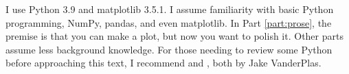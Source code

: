 I use Python 3.9 and matplotlib 3.5.1. I assume familiarity with basic Python programming, NumPy, pandas, and even matplotlib. In Part \ref{part:prose}, the premise is that you can make a plot, but now you want to polish it. Other parts assume less background knowledge. For those needing to review some Python before approaching this text, I recommend  and , both by Jake VanderPlas.

